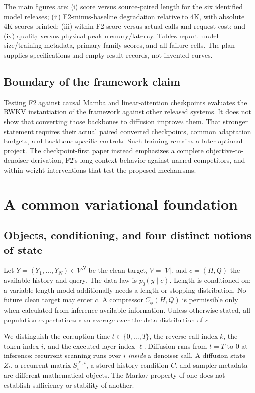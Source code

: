 \documentclass{article}
\theoremstyle{remark}\newtheorem{remark}[theorem]{Remark}
\begin{document}
The main figures are: (i) score versus source-paired length for the six identified model releases; (ii) F2-minus-baseline degradation relative to 4K, with absolute 4K scores printed; (iii) within-F2 score versus actual calls and request cost; and (iv) quality versus physical peak memory/latency. Tables report model size/training metadata, primary family scores, and all failure cells. The plan supplies specifications and empty result records, not invented curves.

\subsection{Boundary of the framework claim}
Testing F2 against causal Mamba and linear-attention checkpoints evaluates the RWKV instantiation of the framework against other released systems. It does not show that converting those backbones to diffusion improves them. That stronger statement requires their actual paired converted checkpoints, common adaptation budgets, and backbone-specific controls. Such training remains a later optional project. The checkpoint-first paper instead emphasizes a complete objective-to-denoiser derivation, F2's long-context behavior against named competitors, and within-weight interventions that test the proposed mechanisms.

\section{A common variational foundation}
\label{sec:foundation}
\subsection{Objects, conditioning, and four distinct notions of state}
Let $Y=(Y_1,\ldots,Y_N)\in\mathcal V^N$ be the clean target, $V=|\mathcal V|$, and $c=(H,Q)$ the available history and query. The data law is $p_0(y\mid c)$. Length is conditioned on; a variable-length model additionally needs a length or stopping distribution. No future clean target may enter $c$. A compressor $C_\phi(H,Q)$ is permissible only when calculated from inference-available information. Unless otherwise stated, all population expectations also average over the data distribution of $c$.

We distinguish the corruption time $t\in\{0,\ldots,T\}$, the reverse-call index $k$, the token index $i$, and the executed-layer index $\ell$. Diffusion runs from $t=T$ to $0$ at inference; recurrent scanning runs over $i$ \emph{inside} a denoiser call. A diffusion state $Z_t$, a recurrent matrix $S_i^{\ell,t}$, a stored history condition $C$, and sampler metadata are different mathematical objects. The Markov property of one does not establish sufficiency or stability of another.
\end{document}
